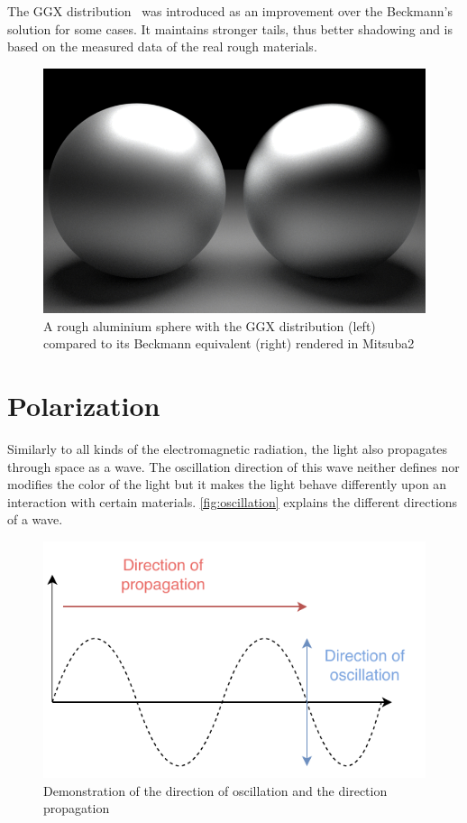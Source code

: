 The GGX distribution~\cite{walter2007microfacet} was introduced as an improvement over the Beckmann's solution for some cases. It maintains stronger tails, thus better shadowing and is based on the measured data of the real rough materials.

\begin{figure}[h]
	\centering
	\includegraphics[width=.8\linewidth]{img/ggx_beckmann.png}
	\caption{A rough aluminium sphere with the GGX distribution (left) compared to its Beckmann equivalent (right) rendered  in Mitsuba2}
	\label{fig:ggx_beckmann}
\end{figure}

\section{Polarization}
\label{sec:polarization}

Similarly to all kinds of the electromagnetic radiation, the light also propagates through space as a wave. The oscillation direction of this wave neither defines nor modifies the color of the light but it makes the light behave differently upon an interaction with certain materials. \autoref{fig:oscillation} explains the different directions of a wave.

\begin{figure}[h]
	\centering
	\includegraphics[width=.6\linewidth]{img/oscillation.pdf}
	\caption{Demonstration of the direction of oscillation and the direction propagation}
	\label{fig:oscillation}
\end{figure}

